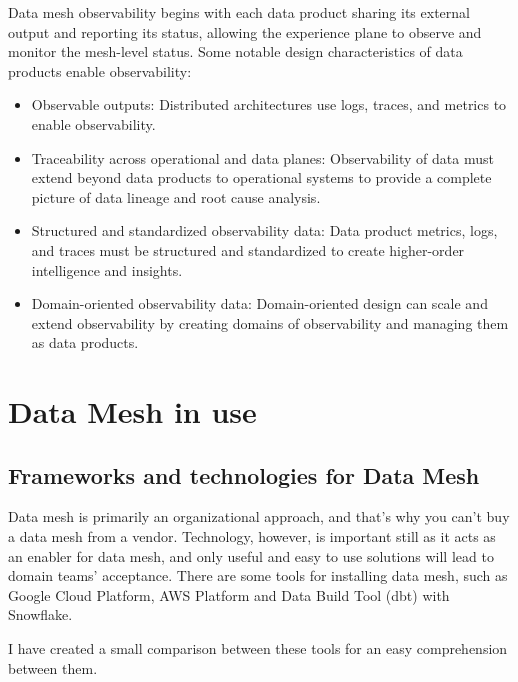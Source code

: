 \documentclass[12pt, a4paper]{book}
\begin{document}
Data mesh observability begins with each data product sharing its external output and reporting its status, allowing the experience plane to observe and monitor the mesh-level status. Some notable design characteristics of data products enable observability:
	\begin{itemize}[nosep]
		\item Observable outputs: Distributed architectures use logs, traces, and metrics to enable observability.
		\item Traceability across operational and data planes: Observability of data must extend beyond data products to operational systems to provide a complete picture of data lineage and root cause analysis.
		\item Structured and standardized observability data: Data product metrics, logs, and traces must be structured and standardized to create higher-order intelligence and insights.
		\item Domain-oriented observability data: Domain-oriented design can scale and extend observability by creating domains of observability and managing them as data products.
	\end{itemize}

\let\cleardoublepage\clearpage
\chapter{Data Mesh in use}

\section{Frameworks and technologies for Data Mesh}
Data mesh is primarily an organizational approach, and that's why you can't buy a data mesh from a vendor. Technology, however, is important still as it acts as an enabler for data mesh, and only useful and easy to use solutions will lead to domain teams' acceptance. There are some tools for installing data mesh, such as Google Cloud Platform, AWS Platform and Data Build Tool (dbt) with Snowflake. \cite{datameshweb}

I have created a small comparison between these tools for an easy comprehension between them.
\end{document}
